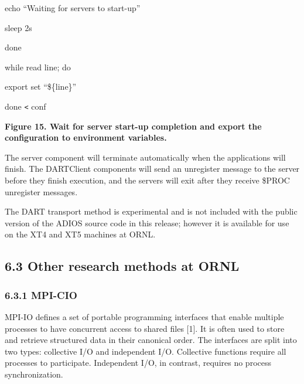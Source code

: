\vspace{6pt}
\parindent=14pt
echo ``Waiting for servers to start-up''

\vspace{6pt}
sleep 2s

\vspace{6pt}
done

\vspace{18pt}
while read line; do

\vspace{6pt}
\parindent=28pt
export set ``\$\{line\}''

\vspace{6pt}
\parindent=0pt
done \texttt{<} conf

\label{HToc144350174}

\vspace{18pt}
{\color{color20} \textbf{Figure 15. Wait for server start-up completion and export 
the configuration to environment variables.}}

\vspace{6pt}
\leftskip=0pt
The server component will terminate automatically when the applications will finish. 
The DARTClient components will send an unregister message to the server before 
they finish execution, and the servers will exit after they receive \$PROC unregister 
messages.

\vspace{6pt}
The DART transport method is experimental and is not included with the public version 
of the ADIOS source code in this release; however it is available for use on the 
XT4 and XT5 machines at ORNL.\label{HToc182553393}

\vspace{6pt}
\subsection*{{\large 6.3 }{\large \textbf{Other research methods at ORNL\label{HToc182553394}}}}

\vspace{10pt}
\subsubsection*{{\large \textbf{6.3.1 MPI-CIO}}}

\vspace{10pt}
MPI-IO defines a set of portable programming interfaces that enable multiple processes 
to have concurrent access to shared files [1]. It is often used to store and retrieve 
structured data in their canonical order. The interfaces are split into two types: 
collective I/O and independent I/O. Collective functions require all processes 
to participate. Independent I/O, in contrast, requires no process synchronization.

